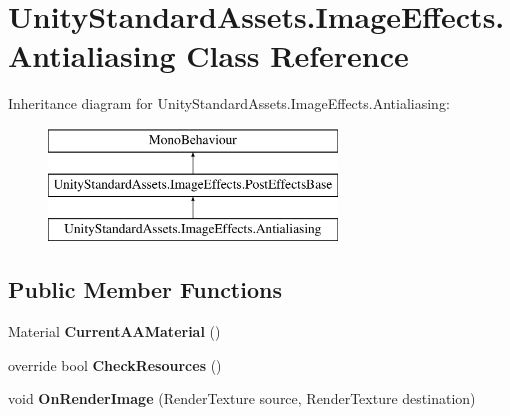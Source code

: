 \hypertarget{class_unity_standard_assets_1_1_image_effects_1_1_antialiasing}{}\section{Unity\+Standard\+Assets.\+Image\+Effects.\+Antialiasing Class Reference}
\label{class_unity_standard_assets_1_1_image_effects_1_1_antialiasing}
Inheritance diagram for Unity\+Standard\+Assets.\+Image\+Effects.\+Antialiasing\+:\begin{figure}[H]
\begin{center}
\leavevmode
\includegraphics[height=3.000000cm]{class_unity_standard_assets_1_1_image_effects_1_1_antialiasing}
\end{center}
\end{figure}
\subsection*{Public Member Functions}
\begin{DoxyCompactItemize}
\item 
Material {\bfseries Current\+A\+A\+Material} ()\hypertarget{class_unity_standard_assets_1_1_image_effects_1_1_antialiasing_afd5cd7bec2f863f5786b9f94a7fd6782}{}\label{class_unity_standard_assets_1_1_image_effects_1_1_antialiasing_afd5cd7bec2f863f5786b9f94a7fd6782}

\item 
override bool {\bfseries Check\+Resources} ()\hypertarget{class_unity_standard_assets_1_1_image_effects_1_1_antialiasing_a9a152887fccdeaf69e9041c84fc42051}{}\label{class_unity_standard_assets_1_1_image_effects_1_1_antialiasing_a9a152887fccdeaf69e9041c84fc42051}

\item 
void {\bfseries On\+Render\+Image} (Render\+Texture source, Render\+Texture destination)\hypertarget{class_unity_standard_assets_1_1_image_effects_1_1_antialiasing_ae00df4da0cf6c832f8bd75b557338cb0}{}\label{class_unity_standard_assets_1_1_image_effects_1_1_antialiasing_ae00df4da0cf6c832f8bd75b557338cb0}

\end{DoxyCompactItemize}
